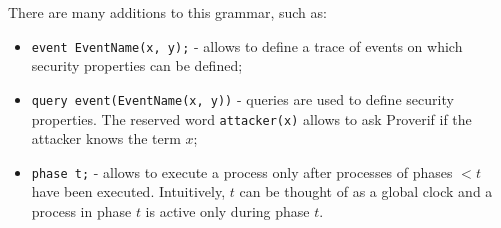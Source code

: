 \lstset{language=proverif}
There are many additions to this grammar, such as:
\begin{itemize}
    \item{\lstinline{event EventName(x, y);} - allows to define a trace of events on which security properties can be defined;}
    \item{\lstinline{query event(EventName(x, y))} - queries are used to define security properties. The reserved word \lstinline{attacker(x)} allows to ask Proverif if the attacker knows the term $x$;}
    \item{\lstinline{phase t;} - allows to execute a process only after processes of phases $< t$ have been executed. Intuitively, $t$ can be thought of as a global clock and a process in phase $t$ is active only during phase $t$.}
\end{itemize}